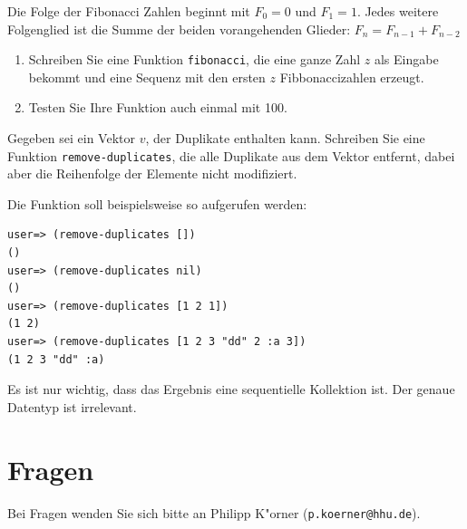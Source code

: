 \documentclass[11pt,a4paper]{article}
\begin{document}
\begin{exercise}[Fibonacci]
Die Folge der Fibonacci Zahlen beginnt mit $F_0=0$ und $F_1=1$. Jedes weitere Folgenglied ist die Summe der beiden vorangehenden Glieder: $F_{n}=F_{n-1}+F_{n-2}$ 
\begin{enumerate}[label=\alph*)]
  \item Schreiben Sie eine Funktion \verb|fibonacci|, die eine ganze  Zahl $z$ als Eingabe bekommt und eine Sequenz mit den ersten $z$ Fibbonaccizahlen erzeugt.
  \item Testen Sie Ihre Funktion auch einmal mit 100.
  \end{enumerate}
\end{exercise}






\begin{exercise}
Gegeben sei ein Vektor $v$, der Duplikate enthalten kann. Schreiben Sie eine Funktion \texttt{remove-duplicates}, die alle Duplikate aus dem Vektor entfernt, dabei aber die Reihenfolge der Elemente nicht modifiziert. 

Die Funktion soll beispielsweise so aufgerufen werden:
\begin{verbatim}
user=> (remove-duplicates [])
()
user=> (remove-duplicates nil)
()
user=> (remove-duplicates [1 2 1])
(1 2)
user=> (remove-duplicates [1 2 3 "dd" 2 :a 3])
(1 2 3 "dd" :a)
\end{verbatim}

Es ist nur wichtig, dass das Ergebnis eine sequentielle Kollektion ist. Der genaue Datentyp ist irrelevant.
\end{exercise}


\section*{Fragen}
Bei Fragen wenden Sie sich bitte an Philipp K"orner (\texttt{p.koerner@hhu.de}).
\end{document}
